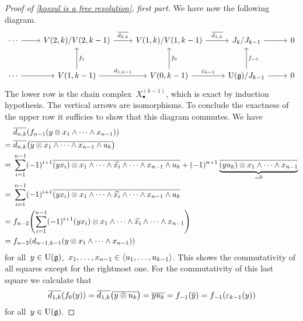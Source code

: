 \begin{proof}[Proof of \cref{koszul is a free resolution}, first part]
  We have now the following diagram.
  \[
    \begin{tikzcd}[row sep = large]
      \dotsb
      \arrow{r}
      &
      V(2, k) / V(2, k-1)
      \arrow{r}[above]{\induced{d_{2,k}}}
      &
      V(1, k) / V(1, k-1)
      \arrow{r}[above]{\induced{d_{1,k}}}
      &
      J_k / J_{k-1}
      \arrow{r}
      &
      0
      \\
      \dotsb
      \arrow{r}
      &
      V(1,k-1)
      \arrow{u}[right]{f_1}
      \arrow{r}[above]{d_{1,k-1}}
      &
      V(0,k-1)
      \arrow{u}[right]{f_0}
      \arrow{r}[above]{\varepsilon_{k-1}}
      &
      \Univ(\glie) / J_{k-1}
      \arrow{u}[right]{f_{-1}}
      \arrow{r}
      &
      0
    \end{tikzcd}
  \]
  The lower row is the chain complex~$X^{(k-1)}_\bullet$, which is exact by induction hypothesis.
  The vertical arrows are isomorphisms.
  To conclude the exactness of the upper row it sufficies to show that this diagram commutes.
  We have
  \begin{align*}
    {}&
    \overline{d_{n,k}}( f_{n-1}( y \otimes x_1 \wedge \dotsb \wedge x_{n-1} ) )
    \\
    ={}&
    \overline{d_{n,k}}\bigl( \overline{ y \otimes x_1 \wedge \dotsb \wedge x_{n-1} \wedge u_k} \bigr)
    \\
    ={}&
    \sum_{i=1}^{n-1}
    (-1)^{i+1} \overline{ (y x_i) \otimes x_1 \wedge \dotsb \wedge \widehat{x_i} \wedge \dotsb \wedge x_{n-1} \wedge u_k }
    + (-1)^{n+1} \underbrace{ \overline{ (y u_k) \otimes x_1 \wedge \dotsb \wedge x_{n-1} } }_{=0}
    \\
    ={}&
    \sum_{i=1}^{n-1}
    (-1)^{i+1} \overline{ (y x_i) \otimes x_1 \wedge \dotsb \wedge \widehat{x_i} \wedge \dotsb \wedge x_{n-1} \wedge u_k }
    \\
    ={}&
    f_{n-2}
    \Biggl(
      \sum_{i=1}^{n-1}
      (-1)^{i+1}
      (y x_i) \otimes x_1 \wedge \dotsb \wedge \widehat{x_i} \wedge \dotsb \wedge x_{n-1}
    \Biggr)
    \\
    ={}&
    f_{n-2}( d_{n-1,k-1}( y \otimes x_1 \wedge \dotsb \wedge x_{n-1} ) )
  \end{align*}
  for all~$y \in \operatorname{U}(\mathfrak{g})$,~$x_1, \dotsc, x_{n-1} \in \langle u_1, \dotsc, u_{k-1}\rangle$.
  This shows the commutativity of all squares except for the rightmost one.
  For the commutativity of this last square we calculate that
  \[
    \overline{d_{1,k}}( f_0( y ) )
    =
    \overline{d_{1,k}}\bigl( \overline{ y \otimes u_k } \bigr)
    =
    \overline{ y u_k }
    =
    f_{-1}( \overline{y} )
    =
    f_{-1}( \varepsilon_{k-1}( y ) )
  \]
  for all~$y \in \operatorname{U}(\mathfrak{g})$.
\end{proof}


